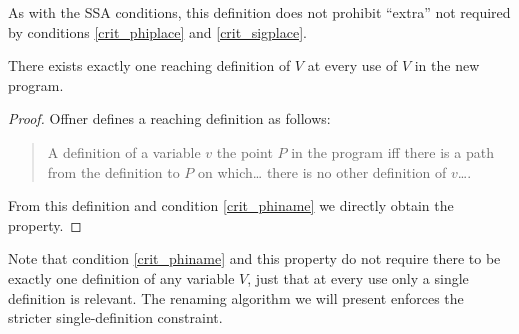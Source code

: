 \documentclass[12pt,titlepage,twoside]{article}
\begin{document}
As with the SSA conditions, this definition does not prohibit
``extra''  not required by conditions
\ref{crit_phiplace} and \ref{crit_sigplace}.

\begin{property}
There exists exactly one reaching definition of $V$ at every use of
$V$ in the new program.
\end{property}
\begin{proof}
Offner \cite{offner95} defines a reaching definition as follows:
\begin{quote}
A definition of a variable $v$  the point $P$ in the
program iff there is a path from the definition to $P$ on which\ldots
there is no other definition of $v$\ldots.
\end{quote}
From this definition and condition \ref{crit_phiname} we directly
obtain the property.
\end{proof}

Note that condition \ref{crit_phiname} and this property do not require
there to be exactly one definition of any variable $V$, just that at
every use only a single definition is relevant.  The renaming
algorithm we will present enforces the stricter single-definition
constraint.
\end{document}
